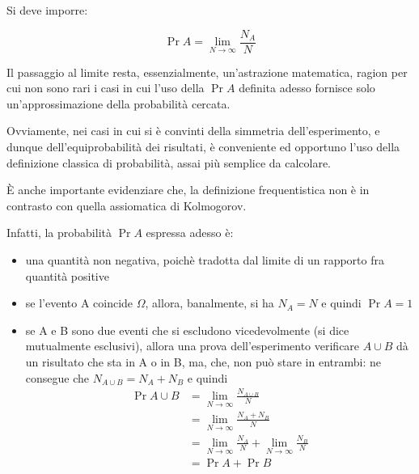 Si deve imporre: 

{
    \Large 
    \begin{equation}
        \Pr{A} = \lim_{N \rightarrow \infty} \frac{N_A}{N}
    \end{equation}
}

Il passaggio al limite resta, essenzialmente, un'astrazione matematica, ragion per cui non sono rari i casi in cui l'uso della $\Pr{A}$ definita adesso fornisce solo un'approssimazione della probabilità cercata. \newline 

Ovviamente, nei casi in cui si è convinti della simmetria dell'esperimento, e dunque dell'equiprobabilità dei risultati, 
è conveniente ed opportuno l'uso della definizione classica di probabilità, assai più semplice da calcolare. \newline 


È anche importante evidenziare che, la definizione frequentistica non è in contrasto con quella assiomatica di Kolmogorov. \newline 

Infatti, la probabilità $\Pr{A}$ espressa adesso è: 

\begin{itemize}
    \item una quantità non negativa, poichè tradotta dal limite di un rapporto fra quantità positive 
    \item se l'evento A coincide $\Omega$, allora, banalmente, si ha $N_A = N$ e quindi $\Pr{A} = 1$
    \item se A e B sono due eventi che si escludono vicedevolmente (si dice mutualmente esclusivi), allora una prova dell'esperimento verificare $A \cup B$ dà un risultato che sta in A o in B, 
    ma, che, non può stare in entrambi: ne consegue che $N_{A \cup B} = N_A + N_B$ e quindi 
    {
        \Large 
        \begin{equation}
            \begin{split}
                \Pr{A \cup B} 
                &= 
                \lim_{N \rightarrow \infty} 
                \frac{N_{A \cup B}}{N} 
                \\ 
                &= 
                \lim_{N \rightarrow \infty} 
                \frac{N_A + N_B}{N} 
                \\ 
                &= 
                \lim_{N \rightarrow \infty} 
                \frac{N_A}{N} 
                + 
                \lim_{N \rightarrow \infty} 
                \frac{N_B}{N} 
                \\ 
                &= 
                \Pr{A} + \Pr{B}
            \end{split}
        \end{equation}
    }
\end{itemize}

